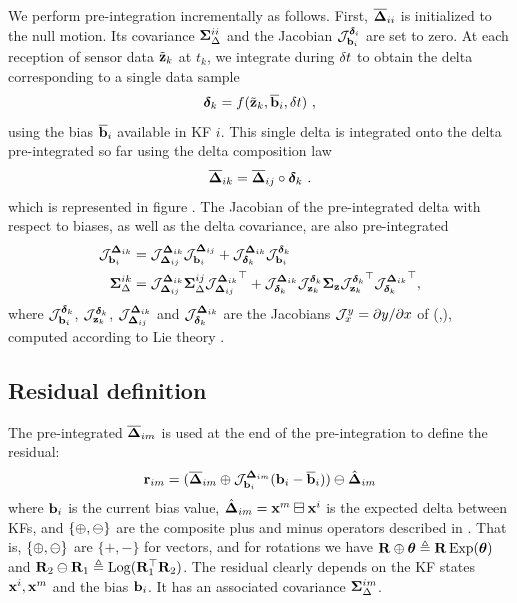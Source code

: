 We perform pre-integration incrementally as follows. 
First, $\overline{{\bm \Delta}}_{ii}$ is initialized to the null motion. 
Its covariance ${\bm \Sigma}_\Delta^{ii}$ and the Jacobian ${\mathcal{J}^{\bm\delta_i}_{{\bf b}_i}}$ are set to zero. 
At each reception of sensor data $\tilde{{\bf z}}_k$ at $t_k$, we integrate during $\delta t$ to obtain the delta corresponding to a single data sample
%
\begin{equation}
    \bm\delta_k = f(\tilde{{\bf z}}_k, \overline{{\bf b}}_i, \delta t)~, 
    \label{eq:data2delta}
\end{equation}
%
using the bias $\overline{{\bf b}}_i$ available in KF $i$. 
This single delta is integrated onto the delta pre-integrated so far using the delta composition law
%
\begin{equation}
    \overline{{\bm \Delta}}_{ik} = \overline{{\bm \Delta}}_{ij} \circ \bm\delta_k~. 
    \label{eq:deltaPlusDelta}
\end{equation}
%
which is represented in figure .
The Jacobian of the pre-integrated delta with respect to biases, as well as the delta covariance, are also pre-integrated
%
\begin{align}
    {\mathcal{J}^{{\bm \Delta}_{ik}}_{{\bf b}_i}} &= {\mathcal{J}^{{\bm \Delta}_{ik}}_{{\bm \Delta}_{ij}}}{\mathcal{J}^{{\bm \Delta}_{ij}}_{{\bf b}_i}} 
+ {\mathcal{J}^{{\bm \Delta}_{ik}}_{\bm\delta_k}}{\mathcal{J}^{\bm\delta_k}_{{\bf b}_i}} \\
    {\bm \Sigma}_\Delta^{ik} &= {\mathcal{J}^{{\bm \Delta}_{ik}}_{{\bm \Delta}_{ij}}}{\bm \Sigma}_\Delta^{ij}{\mathcal{J}^{{\bm \Delta}_{ik}}_{{\bm \Delta}_{ij}}}^{\top} 
+ {\mathcal{J}^{{\bm \Delta}_{ik}}_{\bm\delta_k}}{\mathcal{J}^{\bm\delta_k}_{{\bf z}_k}}{\bm \Sigma}_{\bf z}{\mathcal{J}^{\bm\delta_k}_{{\bf z}_k}}^{\top}{\mathcal{J}^{{\bm \Delta}_{ik}}_{\bm\delta_k}}^{\top},
\end{align}
%
where ${\mathcal{J}^{\bm\delta_k}_{{\bf b}_i}}$, ${\mathcal{J}^{\bm\delta_k}_{{\bf z}_k}}$, ${\mathcal{J}^{{\bm \Delta}_{ik}}_{{\bm \Delta}_{ij}}}$ and ${\mathcal{J}^{{\bm \Delta}_{ik}}_{\bm\delta_k}}$ 
are the Jacobians ${\mathcal{J}^{y}_{x}}=\partial y/\partial x$ of (,), computed according to Lie theory \cite{sola2018micro}.


\subsection{Residual definition}
\label{sec:preint_residual}

The pre-integrated $\overline{{\bm \Delta}}_{im}$ is used at the end of the pre-integration to define the residual:
%
\begin{align}
    {\bf r}_{im} = (\overline{{\bm \Delta}}_{im} \oplus {\mathcal{J}^{{\bm \Delta}_{im}}_{{\bf b}_i}}({\bf b}_i-\overline{{\bf b}}_i) ) \ominus \hat{{\bm \Delta}}_{im}
    \label{eq:preint_residual}
\end{align}
%
where ${\bf b}_i$ is the current bias value,  $\hat{{\bm \Delta}}_{im}={\bf x}^m\boxminus{\bf x}^i$ is the expected delta between KFs, and $\{\oplus,\ominus\}$ are the composite
 plus and minus operators described in \cite{sola2018micro}. 
That is, $\{\oplus,\ominus\}$ are $\{+,-\}$ for vectors, and for rotations we have ${\bf R}\oplus\bm\theta\triangleq{\bf R}\operatorname*{Exp}(\bm\theta)$ and ${\bf R}_2\ominus{\bf R}_1\triangleq\operatorname*{Log}({\bf R}_1^{\top}{\bf R}_2)$. 
The residual clearly depends on the KF states ${\bf x}^i,{\bf x}^m$ and the bias ${\bf b}_i$. It has an associated covariance  ${\bm \Sigma}_\Delta^{im}$.



